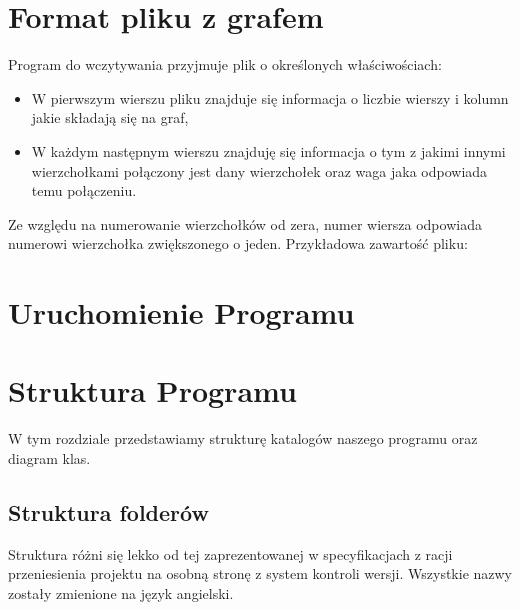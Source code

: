 \documentclass[10pt, a4paper]{report}
\begin{document}
\section{Format pliku z grafem}\label{sec:format-pliku-z-grafem}
Program do wczytywania przyjmuje plik o określonych
właściwościach:
\begin{itemize}
  \item W pierwszym wierszu pliku znajduje się informacja o liczbie wierszy i
        kolumn jakie składają się na graf,
  \item W każdym następnym wierszu znajduję się informacja o tym z jakimi
        innymi wierzchołkami połączony jest dany wierzchołek oraz waga jaka odpowiada
        temu połączeniu.
\end{itemize}
Ze względu na numerowanie wierzchołków od zera, numer wiersza odpowiada
numerowi wierzchołka zwiększonego o jeden.
Przykładowa zawartość pliku:


\section{Uruchomienie Programu}\label{sec:uruchomienie-programu}

\section{Struktura Programu}\label{sec:struktura-programu}
W tym rozdziale przedstawiamy strukturę katalogów naszego programu oraz diagram
klas.

\subsection{Struktura folderów}\label{subsec:struktura-folderów}
Struktura różni się lekko od tej zaprezentowanej w specyfikacjach z racji
przeniesienia projektu na osobną stronę
z system kontroli wersji. Wszystkie nazwy zostały zmienione na język angielski.
\end{document}
